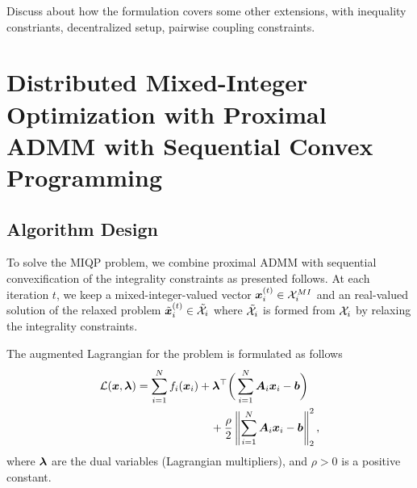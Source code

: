 \documentclass[twocolumn,amsthm]{autart}%
\theoremstyle{definition}
\newtheorem{definition}{Definition}
\theoremstyle{plain}
\begin{document}



Discuss about how the formulation covers some other extensions, \eg with inequality constriants, decentralized setup, pairwise coupling constraints. 

\section{Distributed Mixed-Integer Optimization with Proximal ADMM with Sequential Convex Programming}

\subsection{Algorithm Design}

To solve the MIQP problem, we combine proximal ADMM \cite{yang2022proximal} with sequential convexification of the integrality constraints as presented follows.
At each iteration $t$, we keep a mixed-integer-valued vector $\boldsymbol{x}_i^{(t)} \in \mathcal{X}_i^{\relax{MI}}$ and an real-valued solution of the relaxed problem $\tilde{\boldsymbol{x}}_i^{(t)} \in \tilde{\mathcal{X}}_i$ where $\tilde{\mathcal{X}}_i$ is formed from $\mathcal{X}_i$ by relaxing the integrality constraints.

The augmented Lagrangian for the problem is formulated as follows
\begin{equation}
\begin{multlined}
\LLL (\bbsym{x}, \bbsym{\lambda}) = \sum_{i=1}^{N} f_i ( \bbsym{x}_i) + \bbsym{\lambda}^\top \bigg(\sum_{i=1}^{N} \bbsym{A}_{i} \bbsym{x}_i - \bbsym{b} \bigg) \\
+ \frac{\rho}{2} \norm{\sum_{i=1}^{N} \bbsym{A}_{i} \bbsym{x}_i - \bbsym{b}}_2^2,
\end{multlined}
\end{equation}
where $\boldsymbol{\lambda}$ are the dual variables (Lagrangian multipliers), and $\rho > 0$ is a positive constant.
\end{document}
